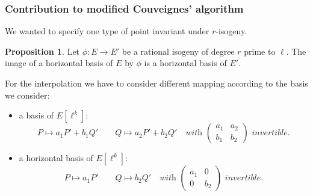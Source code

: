 \documentclass[10pt,a4paper]{beamer}
\theoremstyle{plain}
\theoremstyle{definition}
\theoremstyle{definition}
\theoremstyle{definition}
\newtheorem{prop}[thm]{Proposition}
\theoremstyle{definition}
\theoremstyle{remark}
\newtheorem{rem}[thm]{Remark}
\theoremstyle{remark}
\begin{document}
\begin{frame}
\frametitle{Contribution to modified Couveignes' algorithm}
We wanted to specify one type of point invariant under $r$-isogeny. %
\begin{prop}
Let $\phi:E\rightarrow E'$ be a rational isogeny of degree $r$ prime to $\ell$. The image of a horizontal basis of $E$ by $\phi$ is a horizontal basis of $E'$.
\end{prop}



For the interpolation we have to consider different mapping according to the basis we consider:
\begin{itemize}
\item a basis of $E[\ell^k]$:
\[
P \mapsto a_1 P' + b_1 Q' \quad \quad Q \mapsto a_2 P' + b_2 Q' \quad \textit{with } \left( \begin{matrix}
a_1 & a_2 \\
b_1 & b_2
\end{matrix}  \right) \textit{ invertible.}
\]

\item a horizontal basis of $E[\ell^k]$:
\[
P \mapsto a_1 P' \quad \quad Q \mapsto b_2 Q' \quad \textit{with } \left( \begin{matrix}
a_1 & 0 \\
0 & b_2
\end{matrix}  \right) \textit{ invertible.}
\]
\end{itemize}
\end{frame}

%
%
%
%
%
%
%
\end{document}
